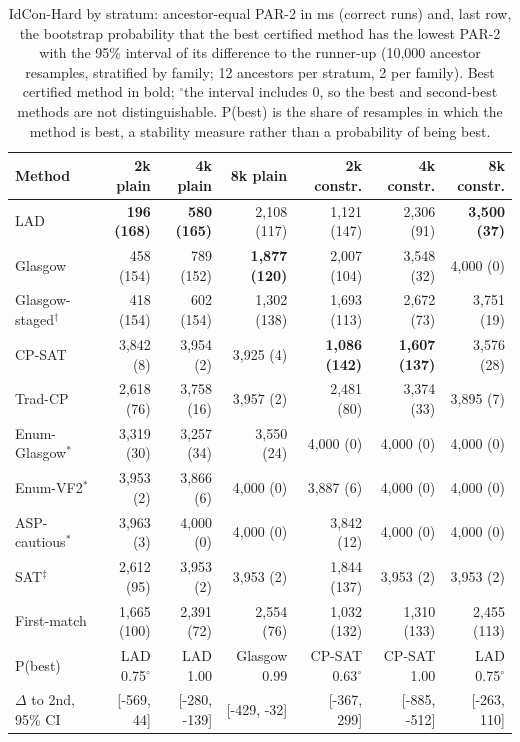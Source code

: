 \begin{table}[t]
\caption{IdCon-Hard by stratum: ancestor-equal PAR-2 in ms (correct runs) and, last row, the bootstrap probability that the best certified method has the lowest PAR-2 with the 95\% interval of its difference to the runner-up (10,000 ancestor resamples, stratified by family; 12 ancestors per stratum, 2 per family). Best certified method in bold; $^{\circ}$the interval includes 0, so the best and second-best methods are not distinguishable. P(best) is the share of resamples in which the method is best, a stability measure rather than a probability of being best.}
\label{tab:strata-hard}
\centering\scriptsize\setlength{\tabcolsep}{2.5pt}
\begin{tabular}{lrrrrrr}
\toprule
Method & 2k plain & 4k plain & 8k plain & 2k constr. & 4k constr. & 8k constr.\\
\midrule
LAD & \textbf{196 (168)} & \textbf{580 (165)} & 2,108 (117) & 1,121 (147) & 2,306 (91) & \textbf{3,500 (37)}\\
Glasgow & 458 (154) & 789 (152) & \textbf{1,877 (120)} & 2,007 (104) & 3,548 (32) & 4,000 (0)\\
Glasgow-staged$^\dagger$ & 418 (154) & 602 (154) & 1,302 (138) & 1,693 (113) & 2,672 (73) & 3,751 (19)\\
CP-SAT & 3,842 (8) & 3,954 (2) & 3,925 (4) & \textbf{1,086 (142)} & \textbf{1,607 (137)} & 3,576 (28)\\
Trad-CP & 2,618 (76) & 3,758 (16) & 3,957 (2) & 2,481 (80) & 3,374 (33) & 3,895 (7)\\
Enum-Glasgow$^\ast$ & 3,319 (30) & 3,257 (34) & 3,550 (24) & 4,000 (0) & 4,000 (0) & 4,000 (0)\\
Enum-VF2$^\ast$ & 3,953 (2) & 3,866 (6) & 4,000 (0) & 3,887 (6) & 4,000 (0) & 4,000 (0)\\
ASP-cautious$^\ast$ & 3,963 (3) & 4,000 (0) & 4,000 (0) & 3,842 (12) & 4,000 (0) & 4,000 (0)\\
SAT$^\ddagger$ & 2,612 (95) & 3,953 (2) & 3,953 (2) & 1,844 (137) & 3,953 (2) & 3,953 (2)\\
First-match & 1,665 (100) & 2,391 (72) & 2,554 (76) & 1,032 (132) & 1,310 (133) & 2,455 (113)\\
\midrule
P(best) & LAD 0.75$^{\circ}$ & LAD 1.00 & Glasgow 0.99 & CP-SAT 0.63$^{\circ}$ & CP-SAT 1.00 & LAD 0.75$^{\circ}$\\
$\Delta$ to 2nd, 95\% CI & [-569, 44] & [-280, -139] & [-429, -32] & [-367, 299] & [-885, -512] & [-263, 110]\\
\bottomrule
\end{tabular}
\end{table}
